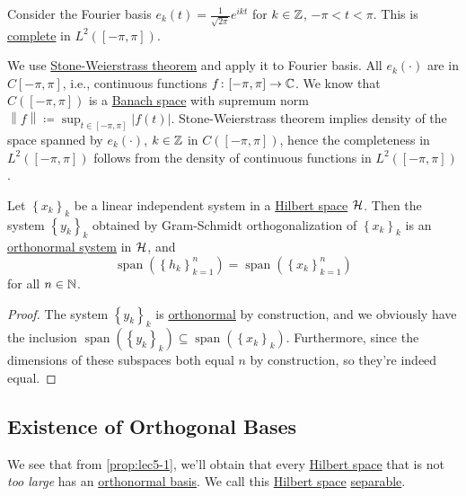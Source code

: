 \begin{eg}
	Consider the Fourier basis \(e_k (t) = \frac{1}{\sqrt{2\pi }} e^{ikt}\) for \(k\in \mathbb{\MakeUppercase{z}} \), \(-\pi < t < \pi \). This is \hyperref[def:complete-system]{complete} in \(L^2([-\pi , \pi ])\).
\end{eg}
\begin{explanation}
	We use \href{https://en.wikipedia.org/wiki/Stone%E2%80%93Weierstrass_theorem}{Stone-Weierstrass theorem} and apply it to Fourier basis. All \(e_k(\cdot)\) are in \(C[-\pi , \pi ]\), i.e., continuous functions \(f\colon [-\pi , \pi ]\to \mathbb{\MakeUppercase{c}} \). We know that \(C([-\pi , \pi ])\) is a \hyperref[def:Banach-space]{Banach space} with supremum norm \(\left\lVert f\right\rVert \coloneqq \sup _{t\in [-\pi, \pi ]}\left\vert f(t) \right\vert\). Stone-Weierstrass theorem implies density of the space spanned by \(e_k(\cdot)\), \(k\in \mathbb{\MakeUppercase{z}} \) in \(C([-\pi , \pi ])\), hence the completeness in \(L^2([-\pi , \pi ])\) follows from the density of continuous functions in \(L^2([-\pi , \pi ])\). 
\end{explanation}

\begin{proposition}\label{prop:lec5-1}
	Let \(\left\{ x_k \right\} _k\) be a linear independent system in a \hyperref[def:Hilbert-space]{Hilbert space} \(\mathcal{\MakeUppercase{h}} \). Then the system \(\left\{ y_k \right\} _k\) obtained by Gram-Schmidt orthogonalization of \(\left\{ x_k \right\} _k\) is an \hyperref[def:orthonormal-system]{orthonormal system} in \(\mathcal{\MakeUppercase{h}} \), and
	\[
		\mathop{\mathrm{span}}(\left\{ h_k \right\} _{k=1}^n) = \mathop{\mathrm{span}}(\left\{ x_k \right\} _{k=1}^n)
	\]
	for all \(n\in \mathbb{\MakeUppercase{n}} \).
\end{proposition}
\begin{proof}
	The system \(\left\{ y_k \right\} _k\) is \hyperref[def:orthonormal-system]{orthonormal} by construction, and we obviously have the inclusion \(\mathop{\mathrm{span}}(\left\{ y_k \right\} _k) \subseteq \mathop{\mathrm{span}}(\left\{ x_k \right\} _k)\). Furthermore, since the dimensions of these subspaces both equal \(n\) by construction, so they're indeed equal.
\end{proof}

\subsection{Existence of Orthogonal Bases}
We see that from \autoref{prop:lec5-1}, we'll obtain that every \hyperref[def:Hilbert-space]{Hilbert space} that is not \emph{too large} has an \hyperref[def:orthonormal-basis]{orthonormal basis}. We call this \hyperref[def:Hilbert-space]{Hilbert space} \hyperref[def:separable]{separable}.


